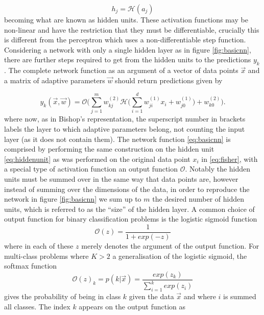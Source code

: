 \begin{equation}
h_j = \mathcal{H}(a_j)
\label{eq:hiddenunit}
\end{equation}
becoming what are known as hidden units. These activation functions may be
non-linear and have the restriction that they must be differentiable, crucially
this is different from the perceptron which uses a non-differentiable step
function. Considering a network with only a single hidden layer as in figure
\ref{fig:basicnn}, there are further steps required to get from the hidden units
to the predictions $y_k$. The complete network function as an argument of a
vector of data points $\vec{x}$ and a matrix of adaptive parameters
$\vec{w}$ should return predictions given by

\begin{equation}
y_k(\vec{x},\vec{w}) = \mathcal{O} \Bigg( \sum_{j=1}^{m} w_{kj}^{(2)}
\mathcal{H} \Bigg( \sum_{i=1}^{d} w_{ji}^{(1)} x_{i} + w_{j0}^{(1)} \Bigg) + w_{k0}^{(2)} \Bigg).
\label{eq:basicnn}
\end{equation}
where now, as in Bishop's representation, the superscript number in brackets
labels the layer to which adaptive parameters belong, not counting the input
layer (as it does not contain them). The network function \eqref{eq:basicnn} is
comprised by performing the same construction on the hidden unit
\eqref{eq:hiddenunit} as was performed on the original data point $x_i$ in
\eqref{eq:fisher}, with a special type of activation function an output function
$\mathcal{O}$. Notably the hidden units must be summed over in the same way that
data points are, however instead of summing over the dimensions of the data, in
order to reproduce the network in figure \ref{fig:basicnn} we sum up to $m$ the
desired number of hidden units, which is referred to as the ``size'' of the
hidden layer. A common choice of output function for binary classification
problems is the logistic sigmoid function
\begin{equation}
\mathcal{O}(z) = \frac{1}{1 + exp(-z)}
\label{eq:sigmoid}
\end{equation}
where in each of these $z$ merely denotes the argument of the output function.
For multi-class problems where $K > 2$ a generalisation of the logistic sigmoid,
the softmax function
\begin{equation}
\mathcal{O}(z)_k = p(k|\vec{x}) = \frac{exp(z_k)}{\sum_{i=1}^kexp(z_i)}
\label{eq:softmax}
\end{equation}
gives the probability of being in class $k$ given the data $\vec{x}$ and
where $i$ is summed all classes. The index $k$ appears on the output function as
